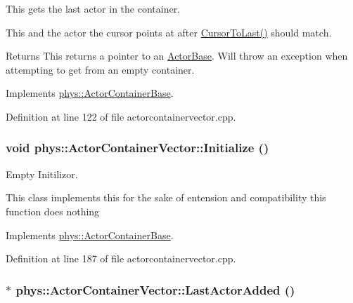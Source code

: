 This gets the last actor in the container. 

This and the actor the cursor points at after \hyperlink{classphys_1_1ActorContainerVector_aa6b08266bbb57a22c07ab50514e58db4}{CursorToLast()} should match. \begin{DoxyReturn}{Returns}
This returns a pointer to an \hyperlink{classphys_1_1ActorBase}{ActorBase}. Will throw an exception when attempting to get from an empty container. 
\end{DoxyReturn}


Implements \hyperlink{classphys_1_1ActorContainerBase_a8efeffd5ae22085fe01af791b3ea559e}{phys::ActorContainerBase}.



Definition at line 122 of file actorcontainervector.cpp.

\hypertarget{classphys_1_1ActorContainerVector_adcebf4329a587669f74e1eacc1e6912c}{
\subsubsection[{Initialize}]{\setlength{\rightskip}{0pt plus 5cm}void phys::ActorContainerVector::Initialize ()}}
\label{d3/d64/classphys_1_1ActorContainerVector_adcebf4329a587669f74e1eacc1e6912c}


Empty Initilizor. 

This class implements this for the sake of entension and compatibility this function does nothing 

Implements \hyperlink{classphys_1_1ActorContainerBase_af36d5866e0ee9f6f450a4e62642e0928}{phys::ActorContainerBase}.



Definition at line 187 of file actorcontainervector.cpp.

\hypertarget{classphys_1_1ActorContainerVector_a49e643bdeff78521de9c4a9fea59a0d2}{
\subsubsection[{LastActorAdded}]{ $\ast$ phys::ActorContainerVector::LastActorAdded ()}}
\label{d3/d64/classphys_1_1ActorContainerVector_a49e643bdeff78521de9c4a9fea59a0d2}


